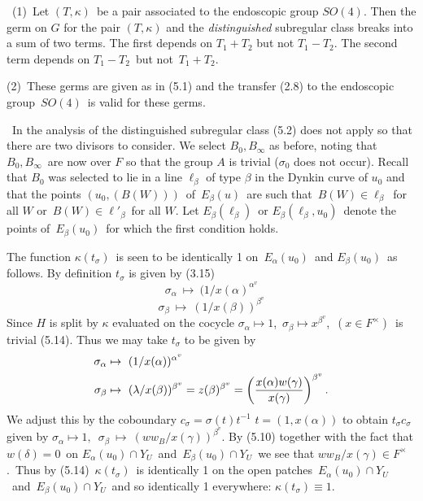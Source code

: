 \ (1)\  Let  $(T,\kappa)$\ be a pair associated to the
endoscopic group $SO(4)$.  Then the germ on $G$ for the pair $(T,\kappa)$ and
the {\it distinguished} subregular class breaks into a sum of two terms.  The first
depends on  $T_1+T_2$ but not  $T_1-T_2$.  The second term depends on
$T_1-T_2$\ but not\ $T_1+T_2$.

\noindent (2)\  These germs are given as in (5.1) and the transfer (2.8) to the 
endoscopic group\ $SO(4)$\ is valid for these germs.
\endproclaim

\ In the analysis of the distinguished subregular class (5.2) does not
apply so that there are two divisors to consider.  We select  $B_0, B_\infty$  as
before, noting that\  $B_0, B_\infty$\ are now over $F$ so that the group $A$ is
trivial ($\sigma_0$ does not occur).  Recall that  $B_0$  was selected to lie in a
line  $\ell_\beta$  of type $\beta$ in the Dynkin      curve of  $u_0$  and that
the points $(u_0, (B(W)))$\ of\ $E_\beta(u)$\ are such that\ $B(W)\in \ell_\beta$\
for all $W$ or\ $B(W)\in \ell'_\beta$\ for all $W$.  Let  $E_\beta(\ell_\beta)$\
or $E_\beta(\ell_\beta,u_0)$\ denote
the points of\ $E_\beta(u_0)$\ for which the first condition holds.

The function  $\kappa(t_\sigma)$\ is seen to be identically 1 on\ $E_\alpha(u_0)$\
and $E_\beta(u_0)$\ as follows.  By definition  $t_\sigma$  is given by (3.15)
$$
\sigma_\alpha ~ \mapsto ~ (1/x(\alpha)^{\alpha^v}
$$
$$
\sigma_\beta ~ \mapsto ~ (1/x(\beta))^{\beta^v}
$$
Since  $H$  is split by  $\kappa$  evaluated on the cocycle
$\sigma_\alpha  \mapsto 1$,\ $\sigma_\beta  \mapsto x^{\beta^v}$,\  
$(x \in F^\times)$\ is trivial (5.14).  Thus we may take $t_\sigma$  to be given by
$$
\aligned
\sigma_\alpha & \mapsto~ (1/x(\alpha))^{\alpha^v} \\
\sigma_\beta & \mapsto~ (\lambda/x(\beta))^{\beta^v} = z(\beta)^{\beta^v} =
\left( {\frac{x(\alpha)w(\gamma)}{x(\gamma)}} \right)^{\beta^v}	.
\endaligned
$$ 
We adjust this by the coboundary  $c_\sigma = \sigma(t)t^{-1}$\quad 
$t = (1,x(\alpha))$
to obtain $t_\sigma c_\sigma$ given by $\sigma_\alpha\mapsto 1,$\
$\sigma_\beta\ \mapsto\ (ww_B/x(\gamma))^{\beta^v}.$   
By (5.10) together with the fact that  $w(\delta) = 0$\ on
$E_\alpha(u_0) \cap Y_U $\  and\ $E_\beta(u_0) \cap Y_U$\  we see that
$ww_B/x(\gamma) \in F^\times$.\  Thus by (5.14)\  $\kappa(t_\sigma)$\
is identically 1 on the open patches\ $E_\alpha(u_0) \cap Y_U$\ and\
$E_\beta(u_0) \cap Y_U$\  and so identically 1 everywhere:  $\kappa(t_\sigma)
\equiv 1$.\  


